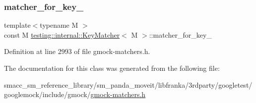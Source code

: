 \subsubsection{\texorpdfstring{matcher\+\_\+for\+\_\+key\+\_\+}{matcher\_for\_key\_}}
{\footnotesize\ttfamily template$<$typename M $>$ \\
const M \hyperlink{classtesting_1_1internal_1_1KeyMatcher}{testing\+::internal\+::\+Key\+Matcher}$<$ M $>$\+::matcher\+\_\+for\+\_\+key\+\_\+\hspace{0.3cm}{\ttfamily [private]}}



Definition at line 2993 of file gmock-\/matchers.\+h.



The documentation for this class was generated from the following file\+:\begin{DoxyCompactItemize}
\item 
smacc\+\_\+sm\+\_\+reference\+\_\+library/sm\+\_\+panda\+\_\+moveit/libfranka/3rdparty/googletest/googlemock/include/gmock/\hyperlink{gmock-matchers_8h}{gmock-\/matchers.\+h}\end{DoxyCompactItemize}
